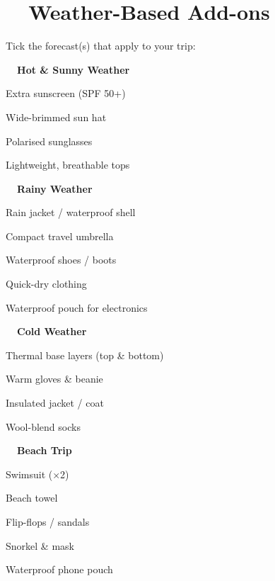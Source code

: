\section{\faCloud\ \ Weather-Based Add-ons}

{\footnotesize\color{medium} Tick the forecast(s) that apply to your trip:\par}

\begin{hlbox}
\textbf{\color{accent}\faSun\ \ Hot \& Sunny Weather}
\begin{checklist}
  \item Extra sunscreen (SPF 50+)
  \item Wide-brimmed sun hat
  \item Polarised sunglasses
  \item Lightweight, breathable tops
\end{checklist}

\vspace{2pt}
\textbf{\color{accent}\faUmbrella\ \ Rainy Weather}
\begin{checklist}
  \item Rain jacket / waterproof shell
  \item Compact travel umbrella
  \item Waterproof shoes / boots
  \item Quick-dry clothing
  \item Waterproof pouch for electronics
\end{checklist}

\vspace{2pt}
\textbf{\color{accent}\faSnowflake\ \ Cold Weather}
\begin{checklist}
  \item Thermal base layers (top \& bottom)
  \item Warm gloves \& beanie
  \item Insulated jacket / coat
  \item Wool-blend socks
\end{checklist}

\vspace{2pt}
\textbf{\color{accent}\faWater\ \ Beach Trip}
\begin{checklist}
  \item Swimsuit ($\times$2)
  \item Beach towel
  \item Flip-flops / sandals
  \item Snorkel \& mask
  \item Waterproof phone pouch
\end{checklist}
\end{hlbox}

